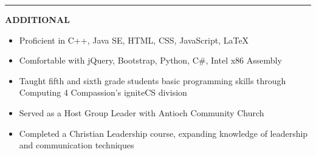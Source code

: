 \documentclass[11pt]{article}
\newenvironment{resumebulletcategory}[1]{
    \begin{spacing}{1.1}
        \textbf{\Large \uppercase{#1}}
        \begin{itemize}[topsep=1pt,itemsep=1pt,partopsep=.5pt, parsep=.5pt]
}{
        \end{itemize}
    \end{spacing}
}
\newcommand*{\resumeseparator}{
    \begin{spacing}{1.1}
        \noindent\rule{\textwidth}{1pt}
    \end{spacing}
}
\begin{document}
    \resumeseparator

    \begin{resumebulletcategory}{Additional}
        \item Proficient in C++, Java SE, HTML, CSS, JavaScript, LaTeX
        \item Comfortable with jQuery, Bootstrap, Python, C\#, Intel x86 Assembly
        \item Taught fifth and sixth grade students basic programming skills through Computing 4 Compassion's igniteCS division
        \item Served as a Host Group Leader with Antioch Community Church
        \item Completed a Christian Leadership course, expanding knowledge of leadership and communication techniques
    \end{resumebulletcategory}
\end{document}
